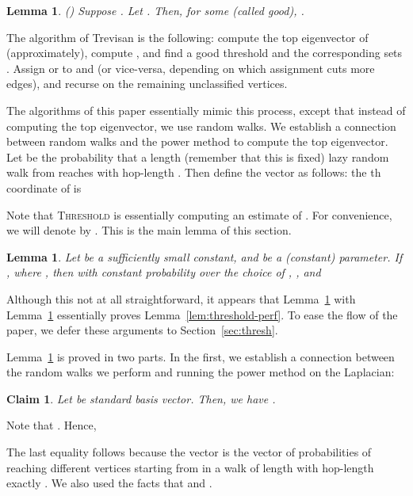 \documentclass[11pt]{article}
\newtheorem{Lem}[theorem]{Lemma}
\newtheorem{claim}[theorem]{Claim}
\newenvironment{myproof}{\noindent {\sc Proof:}}{}
\newcommand\Threshold{\textsc{Threshold}\xspace}
\begin{document}
\begin{Lem}\label{lem:soto} (\cite{Sot09}) Suppose .
Let .
Then, for some  (called \emph{good}),
.
\end{Lem}

The algorithm of Trevisan is the following: compute the top eigenvector  of  (approximately), compute , and find a good threshold  and the corresponding sets . Assign  or  to  and  (or vice-versa, depending on which assignment cuts more edges), and recurse on the remaining unclassified vertices.

The algorithms of this paper essentially mimic this process, except that
instead of computing the top eigenvector, we use random walks. We establish a
connection between random walks and the power method to compute the top
eigenvector. Let  be the probability that a length  (remember that this
is fixed) lazy
random walk from  reaches  with hop-length . Then define the vector
 as follows: the th coordinate of  is 

Note that {\Threshold} is essentially computing an estimate 
of . For convenience, we will denote  by .
This is the main lemma of this section.
\begin{Lem}\label{lem:good-q}
Let  be a sufficiently small constant, and  be
a (constant) parameter.
If , where , then
with constant probability over the choice of ,
, and

\end{Lem}

Although this not at all straightforward, it appears that Lemma~\ref{lem:good-q}
with Lemma~\ref{lem:soto} essentially proves Lemma~\ref{lem:threshold-perf}.
To ease the flow of the paper, we defer these arguments to Section~\ref{sec:thresh}.

Lemma~\ref{lem:good-q} is proved in two parts. In the first, we establish a connection
between the random walks we perform and running the power method on the
Laplacian:
\begin{claim} \label{lem:lap-rw} Let  be  standard basis vector. Then, we
have
.
\end{claim}
\begin{myproof} Note that . Hence,

The last equality follows because the vector  is
the vector of probabilities of reaching different vertices starting from  in a walk of length  with hop-length exactly . We also used the
facts that  and .
\end{myproof}\\
\end{document}
